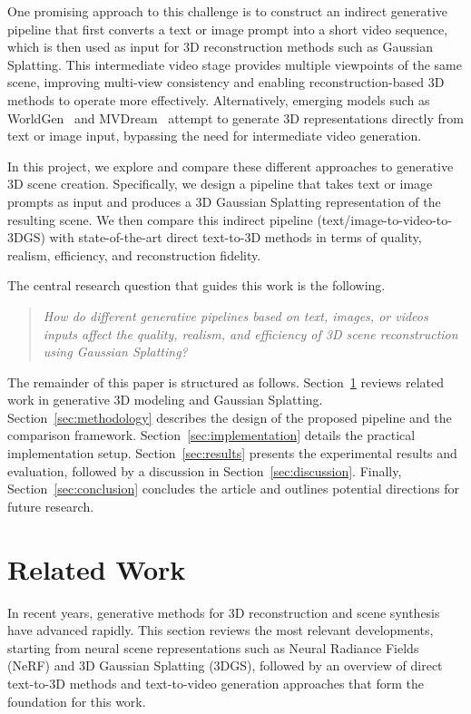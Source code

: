 \documentclass[conference]{IEEEtran}
\begin{document}
One promising approach to this challenge is to construct an indirect generative pipeline that first converts a text or image prompt into a short video sequence, which is then used as input for 3D reconstruction methods such as Gaussian Splatting. This intermediate video stage provides multiple viewpoints of the same scene, improving multi-view consistency and enabling reconstruction-based 3D methods to operate more effectively. Alternatively, emerging models such as WorldGen~\cite{worldgen_site} and MVDream~\cite{mvdream_paper} attempt to generate 3D representations directly from text or image input, bypassing the need for intermediate video generation.

In this project, we explore and compare these different approaches to generative 3D scene creation. Specifically, we design a pipeline that takes text or image prompts as input and produces a 3D Gaussian Splatting representation of the resulting scene. We then compare this indirect pipeline (text/image-to-video-to-3DGS) with state-of-the-art direct text-to-3D methods in terms of quality, realism, efficiency, and reconstruction fidelity.

The central research question that guides this work is the following.

\begin{quote}
\emph{How do different generative pipelines based on text, images, or videos inputs affect the quality, realism, and efficiency of 3D scene reconstruction using Gaussian Splatting?}
\end{quote}

The remainder of this paper is structured as follows. Section~\ref{sec:relatedwork} reviews related work in generative 3D modeling and Gaussian Splatting. Section~\ref{sec:methodology} describes the design of the proposed pipeline and the comparison framework. Section~\ref{sec:implementation} details the practical implementation setup. Section~\ref{sec:results} presents the experimental results and evaluation, followed by a discussion in Section~\ref{sec:discussion}. Finally, Section~\ref{sec:conclusion} concludes the article and outlines potential directions for future research.

\section{Related Work}
\label{sec:relatedwork}

In recent years, generative methods for 3D reconstruction and scene synthesis have advanced rapidly. 
This section reviews the most relevant developments, starting from neural scene representations such as Neural Radiance Fields (NeRF) and 3D Gaussian Splatting (3DGS), followed by an overview of direct text-to-3D methods and text-to-video generation approaches that form the foundation for this work.
\end{document}
